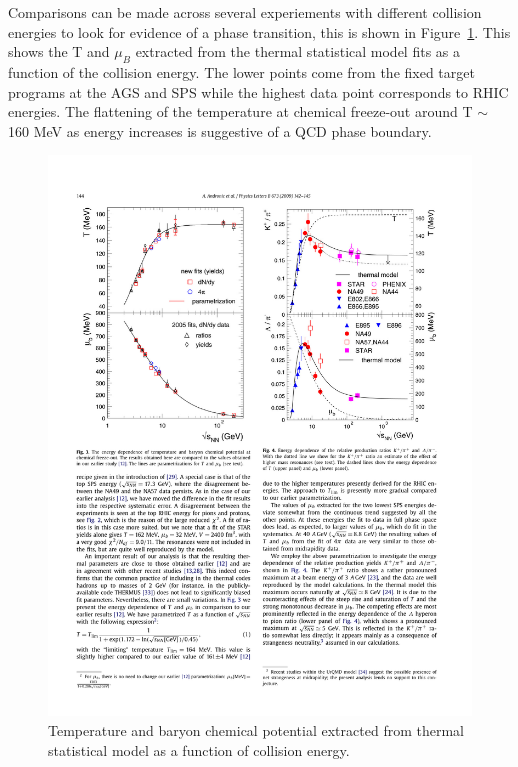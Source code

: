 Comparisons can be made across several experiements with different collision energies to look for evidence of a phase transition, this is shown in Figure~\ref{fig:T_mu}. This shows the T and $\mu_B$ extracted from the thermal statistical model fits as a function of the collision energy. The lower points come from the fixed target programs at the AGS and SPS while the highest data point corresponds to RHIC energies. The flattening of the temperature at chemical freeze-out around T $\sim$ 160 MeV as energy increases is suggestive of a QCD phase boundary.

\begin{figure}[htbp]
\begin{center}
\includegraphics[scale=1.3]{Plots/Intro/freezeout.pdf}
\end{center}
\caption[Freeze-out T and $\mu_B$]{Temperature and baryon chemical potential extracted from thermal statistical model as a function of collision energy.}
\label{fig:T_mu}
\end{figure}

